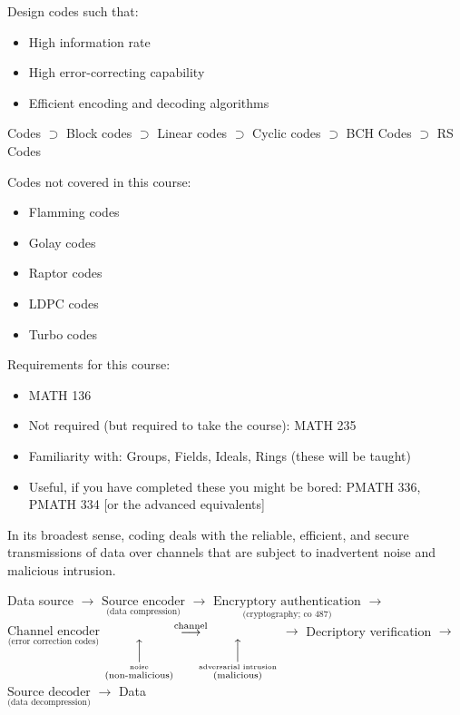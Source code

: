 Design codes such that:
\begin{itemize}
    \item High information rate
    \item High error-correcting capability
    \item Efficient encoding and decoding algorithms
\end{itemize}

Codes $ \supset $ Block codes $ \supset $  Linear codes
$ \supset $  Cyclic codes $ \supset $ BCH Codes
$ \supset $ RS Codes

Codes not covered in this course:
\begin{itemize}
    \item Flamming codes
    \item Golay codes
    \item Raptor codes
    \item LDPC codes
    \item Turbo codes
\end{itemize}

Requirements for this course:
\begin{itemize}
    \item MATH 136
    \item Not required (but required to take the course): MATH 235
    \item Familiarity with: Groups, Fields, Ideals, Rings (these will be taught)
    \item Useful, if you have completed these you might be bored:
          PMATH 336, PMATH 334 [or the advanced equivalents]
\end{itemize}


In its broadest sense, coding deals with the reliable, efficient, and secure
transmissions of data over channels that are subject to inadvertent noise and
malicious intrusion.

Data source
$ \rightarrow $
$ \underset{\text{(data compression)}}{\text{Source encoder}} $
$ \rightarrow $
$ \underset{\text{(cryptography; co 487)}}{\text{Encryptory authentication}} $
$ \rightarrow $
$ \underset{\text{(error correction codes)}}{\text{Channel encoder}} $
$ \underset
    {
        \overset{\Big\uparrow}{\overset{\text{noise}}{\text{(non-malicious)}}}\qquad
        \overset{\Big\uparrow}{\overset{\text{adversarial intrusion}}{\text{(malicious)}}}
    }
    {\overset{\text{channel}}{\longrightarrow}} $
$ \rightarrow $
Decriptory verification
$ \rightarrow $
$ \underset{\text{(data decompression)}}{\text{Source decoder}}  $
$ \rightarrow $
Data